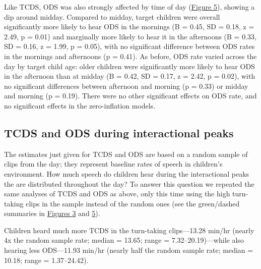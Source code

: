 \documentclass[floatsintext,man]{apa6}
\theoremstyle{definition}
\theoremstyle{definition}
\theoremstyle{definition}
\theoremstyle{remark}
\begin{document}
Like TCDS, ODS was also strongly affected by time of day
(\protect\hyperlink{fig5}{Figure 5}), showing a dip around midday.
Compared to midday, target children were overall significantly more
likely to hear ODS in the mornings (B = 0.45, SD = 0.18, z = 2.49, p =
0.01) and marginally more likely to hear it in the afternoons (B = 0.33,
SD = 0.16, z = 1.99, p = 0.05), with no significant difference between
ODS rates in the mornings and afternoons (p = 0.41). As before, ODS rate
varied across the day by target child age: older children were
significantly more likely to hear ODS in the afternoon than at midday (B
= 0.42, SD = 0.17, z = 2.42, p = 0.02), with no significant differences
between afternoon and morning (p = 0.33) or midday and morning (p =
0.19). There were no other significant effects on ODS rate, and no
significant effects in the zero-inflation models.

\subsection{TCDS and ODS during interactional
peaks}\label{tcds-and-ods-during-interactional-peaks}

The estimates just given for TCDS and ODS are based on a random sample
of clips from the day; they represent baseline rates of speech in
children's environment. How much speech do children hear during the
interactional peaks the are distributed throughout the day? To answer
this question we repeated the same analyses of TCDS and ODS as above,
only this time using the high turn-taking clips in the sample instead of
the random ones (see the green/dashed summaries in
\protect\hyperlink{fig3}{Figures 3} and \protect\hyperlink{fig5}{5}).

Children heard much more TCDS in the turn-taking clips---13.28 min/hr
(nearly 4x the random sample rate; median = 13.65; range =
7.32--20.19)---while also hearing less ODS---11.93 min/hr (nearly half
the random sample rate; median = 10.18; range = 1.37--24.42).
\end{document}
